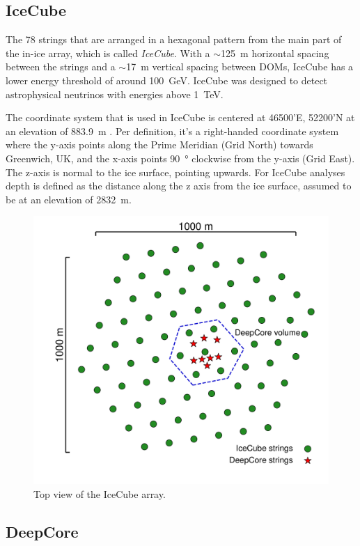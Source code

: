 \subsection{IceCube}

The 78 strings that are arranged in a hexagonal pattern from the main part of the in-ice array, which is called \textit{IceCube}. With a $\sim$\SI{125}{\metre} horizontal spacing between the strings and a $\sim$\SI{17}{\metre} vertical spacing between DOMs, IceCube has a lower energy threshold of around \SI{100}{GeV}. IceCube was designed to detect astrophysical neutrinos with energies above \SI{1}{\tera\electronvolt}.

The coordinate system that is used in IceCube is centered at 46500'E, 52200'N at an elevation of \SI{883.9}{\metre} . Per definition, it's a right-handed coordinate system where the y-axis points along the Prime Meridian (Grid North) towards Greenwich, UK, and the x-axis points \SI{90}{\degree} clockwise from the y-axis (Grid East). The z-axis is normal to the ice surface, pointing upwards. For IceCube analyses depth is defined as the distance along the z axis from the ice surface, assumed to be at an elevation of \SI{2832}{\metre}.

\begin{figure}
    \includegraphics[trim={2.0cm, 1.5cm, 0, 0}, clip, width=0.65\linewidth]{figures/icecube_deepcore/icecube_top_view_bw.pdf}
    \caption[IceCube top view]{Top view of the IceCube array.}
\end{figure}


\subsection{DeepCore}

